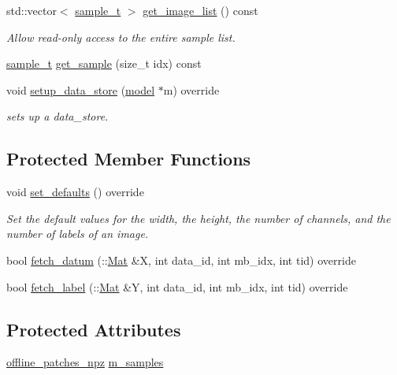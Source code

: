 \begin{DoxyCompactItemize}
std\+::vector$<$ \hyperlink{classlbann_1_1image__data__reader_a7580011ef6ef9da32e1a3bc49ad0706c}{sample\+\_\+t} $>$ \hyperlink{classlbann_1_1data__reader__triplet_a41a1506e4a77e610fd8db5a618e3e576}{get\+\_\+image\+\_\+list} () const
\begin{DoxyCompactList}\small\item\em Allow read-\/only access to the entire sample list. \end{DoxyCompactList}\item 
\hyperlink{classlbann_1_1image__data__reader_a7580011ef6ef9da32e1a3bc49ad0706c}{sample\+\_\+t} \hyperlink{classlbann_1_1data__reader__triplet_a6ed35c191d890569db4865424b8b0e82}{get\+\_\+sample} (size\+\_\+t idx) const
\item 
void \hyperlink{classlbann_1_1data__reader__triplet_a2cd6fd46a7d2d90ccd754404683834c6}{setup\+\_\+data\+\_\+store} (\hyperlink{classlbann_1_1model}{model} $\ast$m) override
\begin{DoxyCompactList}\small\item\em sets up a data\+\_\+store. \end{DoxyCompactList}\end{DoxyCompactItemize}
\subsection*{Protected Member Functions}
\begin{DoxyCompactItemize}
\item 
void \hyperlink{classlbann_1_1data__reader__triplet_a88bc385a2d42e9f78a768ff496036843}{set\+\_\+defaults} () override
\begin{DoxyCompactList}\small\item\em Set the default values for the width, the height, the number of channels, and the number of labels of an image. \end{DoxyCompactList}\item 
bool \hyperlink{classlbann_1_1data__reader__triplet_af3f41e46bef2fbd3e19d545fa27f11ce}{fetch\+\_\+datum} (\+::\hyperlink{base_8hpp_a68f11fdc31b62516cb310831bbe54d73}{Mat} \&X, int data\+\_\+id, int mb\+\_\+idx, int tid) override
\item 
bool \hyperlink{classlbann_1_1data__reader__triplet_a69dc790a54edde4d123fd7e62df6e5b8}{fetch\+\_\+label} (\+::\hyperlink{base_8hpp_a68f11fdc31b62516cb310831bbe54d73}{Mat} \&Y, int data\+\_\+id, int mb\+\_\+idx, int tid) override
\end{DoxyCompactItemize}
\subsection*{Protected Attributes}
\begin{DoxyCompactItemize}
\item 
\hyperlink{classlbann_1_1offline__patches__npz}{offline\+\_\+patches\+\_\+npz} \hyperlink{classlbann_1_1data__reader__triplet_a1f414c6d80f6e48fc91f98db0531f1f8}{m\+\_\+samples}
\end{DoxyCompactItemize}


